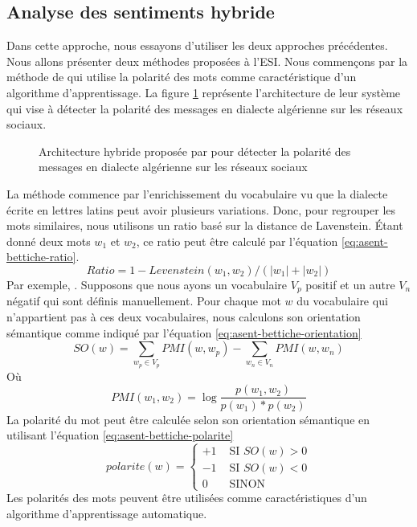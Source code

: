 \documentclass{KodeBook}
\begin{document}
\subsection{Analyse des sentiments hybride}

Dans cette approche, nous essayons d'utiliser les deux approches précédentes.
Nous allons présenter deux méthodes proposées à l'ESI. 
Nous commençons par la méthode de \citet{18-bettiche-al} qui utilise la polarité des mots comme caractéristique d'un algorithme d'apprentissage.
La figure \ref{fig:asent-bettiche} représente l'architecture de leur système qui vise à détecter la polarité des messages en dialecte algérienne sur les réseaux sociaux.

\begin{figure}
	\centering
	\caption[Architecture hybride pour détecter la polarité en dialecte algérienne]{Architecture hybride proposée par \citet{18-bettiche-al} pour détecter la polarité des messages en dialecte algérienne sur les réseaux sociaux}
	\label{fig:asent-bettiche}
\end{figure}

La méthode commence par l'enrichissement du vocabulaire vu que la dialecte écrite en lettres latins peut avoir plusieurs variations. 
Donc, pour regrouper les mots similaires, nous utilisons un ratio basé sur la distance de Lavenstein. 
Étant donné deux mots $w_1$ et $w_2$, ce ratio peut être calculé par l'équation \ref{eq:asent-bettiche-ratio}.
\begin{equation}\label{eq:asent-bettiche-ratio}
Ratio = 1 - Levenstein(w_1, w_2)/(|w_1|+|w_2|)
\end{equation}
Par exemple, .
Supposons que nous ayons un vocabulaire $V_p$ positif et un autre $V_n$ négatif qui sont définis manuellement. 
Pour chaque mot $w$ du vocabulaire qui n'appartient pas à ces deux vocabulaires, nous calculons son orientation sémantique comme indiqué par l'équation \ref{eq:asent-bettiche-orientation}
\begin{equation}\label{eq:asent-bettiche-orientation}
SO(w) = \sum_{w_p \in V_p} PMI(w, w_p) - \sum_{w_n \in V_n} PMI(w, w_n)
\end{equation}
Où
\[PMI (w_1, w_2) = \log \frac{p(w_1, w_2)}{p(w_1)*p(w_2)}\]
La polarité du mot peut être calculée selon son orientation sémantique en utilisant l'équation \ref{eq:asent-bettiche-polarite}
\begin{equation}\label{eq:asent-bettiche-polarite}
polarite(w) = \begin{cases}
 +1 & \text{ SI } SO(w) > 0\\
-1 & \text{ SI } SO(w) < 0 \\
0   &\text{ SINON }
\end{cases}
\end{equation}
Les polarités des mots peuvent être utilisées comme caractéristiques d'un algorithme d'apprentissage automatique.
\end{document}
